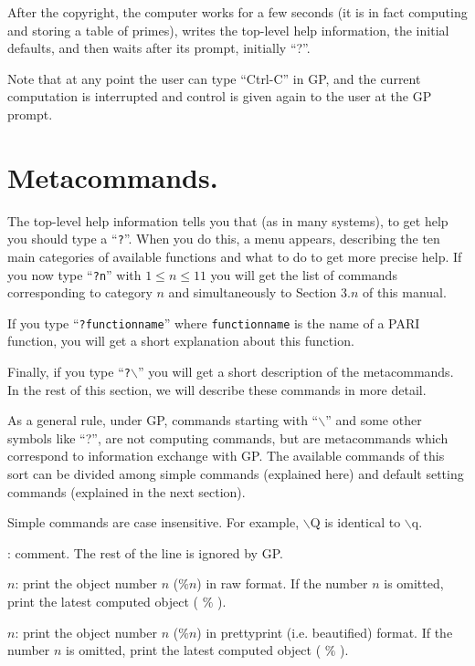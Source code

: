 After the copyright, the computer works for a few seconds (it is in fact
computing and storing a table of primes), writes the top-level
help information, the initial defaults, and then waits after its
prompt, initially ``?''.

Note that at any point the user can type ``Ctrl-C'' in GP, and the
current computation is interrupted and control is given again to the user
at the GP prompt.

\section{Metacommands.}

The top-level help information tells you that (as in many systems), to
get help you should type a ``{\tt ?}''. When you do this, a menu appears,
describing the ten main categories of available functions and what to do
to get more precise help. If you now type ``{\tt ?n}'' with $1\le n\le11$
you will get the list of commands corresponding to category $n$ and
simultaneously to Section $3.n$ of this manual. 

If you type ``{\tt ?functionname}'' where {\tt functionname} is the
name of a PARI function, you will get a short explanation about this
function.

Finally, if you type ``{\tt ?$\backslash$}'' you will get a short
description of the metacommands. In the rest of this section, we will
describe these commands in more detail.

As a general rule, under GP, commands starting with ``$\backslash$'' and some
other symbols like ``?'', are not computing commands, but are metacommands
which correspond to information exchange with GP. The available commands of 
this sort can be divided among simple commands (explained here) and default
setting commands (explained in the next section).

Simple commands are case insensitive. For example, $\backslash$Q is identical 
to $\backslash$q.

\subsec{$\backslash\backslash$}: comment. The rest of the line
is ignored by GP.

$n$: print the object number $n$ ($\%n$)
in raw format. If the number $n$ is omitted, print the latest computed object
( $\%$ ).

$n$: print the object number $n$ ($\%n$)
in prettyprint (i.e. beautified) format. If the number $n$ is omitted,
print the latest computed object ( $\%$ ).

